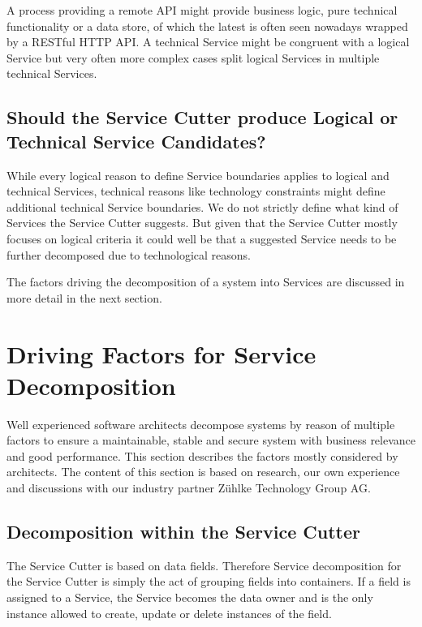 A process providing a remote API might provide business logic, pure technical functionality or a data store, of which the latest is often seen nowadays wrapped by a RESTful HTTP API. A technical Service might be congruent with a logical Service but very often more complex cases split logical Services in multiple technical Services. 

\subsection{Should the Service Cutter produce Logical or Technical Service Candidates?}

While every logical reason to define Service boundaries applies to logical and technical Services, technical reasons like technology constraints might define additional technical Service boundaries. We do not strictly define what kind of Services the Service Cutter suggests. But given that the Service Cutter mostly focuses on logical criteria it could well be that a suggested Service needs to be further decomposed due to technological reasons.

The factors driving the decomposition of a system into Services are discussed in more detail in the next section.

\section{Driving Factors for Service Decomposition}

Well experienced software architects decompose systems by reason of multiple factors to ensure a maintainable, stable and secure system with business relevance and good performance. This section describes the factors mostly considered by architects. The content of this section is based on research, our own experience and discussions with our industry partner Zühlke Technology Group AG. 

\subsection{Decomposition within the Service Cutter}

The Service Cutter is based on data fields. Therefore Service decomposition for the Service Cutter is simply the act of grouping fields into containers. If a field is assigned to a Service, the Service becomes the data owner and is the only instance allowed to create, update or delete instances of the field.



